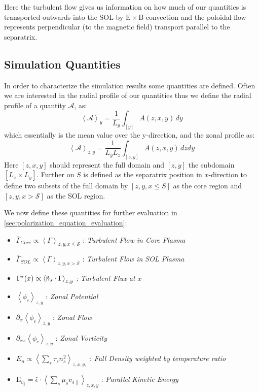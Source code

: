 \documentclass[master.tex]{subfiles}
\newcommand{\meanxy}[1]{\left<#1\right>_{z,y}}
\begin{document}
Here the turbulent flow gives us information on how much of our quantities is transported outwards into the \ac{SOL} by $\mathrm{E}\times\mathrm{B}$ convection and the poloidal flow represents perpendicular (to the magnetic field) transport parallel to the separatrix.

\subsection{Simulation Quantities}\label{sec:simulation_quantities}



In order to characterize the simulation results some quantities are defined. Often we are interested in the radial profile of our quantities thus we define the radial profile of a quantity $\mathcal{A}$, as:
\begin{equation}
    \left<\mathcal{A}\right>_y = \frac{1}{L_y} \int_{[y]} A(z,x,y) \, dy
\end{equation}
which essentially is the mean value over the y-direction,
and the zonal profile as:
\begin{equation}
    \left<\mathcal{A}\right>_{z, y} =\frac{1}{L_yL_z} \int_{[z, y]} A(z,x,y) \, dzdy
\end{equation}
Here $[z,x,y]$ should represent the full domain and $[z,y]$ the subdomain $[L_z \times L_y]$. Further on $S$ is defined as the separatrix position in $x$-direction to define two subsets of the full domain by $[z,y,x\leq S]$ as the core region and $[z,y,x > \mathcal{S}]$ as the \ac{SOL} region.



We now define these quantities for further evaluation in \autoref{sec:polarization_equation_evaluation}:

\begin{itemize}
    \item $\overline{\Gamma}_{Core} \propto  \left<\Gamma\right>_{z,y, x \leq \mathcal{S}}$ : \textit{Turbulent Flow in Core Plasma}
    \item  $\overline{\Gamma}_{SOL} \propto  \left<\Gamma\right>_{z,y, x > \mathcal{S}}$ : \textit{Turbulent Flow in \ac{SOL} Plasma}
    \item $\Gamma^*(x) \propto \left<\Tilde{n}_s \cdot \Gamma\right>_{z,y}$ : \textit{Turbulent Flux at $x$}
    \item $\meanxy{\phi_e}$ : \textit{Zonal Potential}
    \item $\partial_x \meanxy{\phi_e}$ : \textit{Zonal Flow}
    \item $\partial_{xx}\meanxy{\phi_e}$ : \textit{Zonal Vorticity}
    \item $E_n \propto \left<\sum_s  \tau_s n_s^2 \right>_{z, x, y,}$ : \textit{Full Density weighted by temperature ratio}
    \item $\mathrm{E}_{v_\parallel} = \hat{\epsilon} \cdot \left<\sum_s \mu_s v_{s\parallel} \right>_{z, x, y}$ : \textit{Parallel Kinetic Energy}
\end{itemize}
\end{document}
